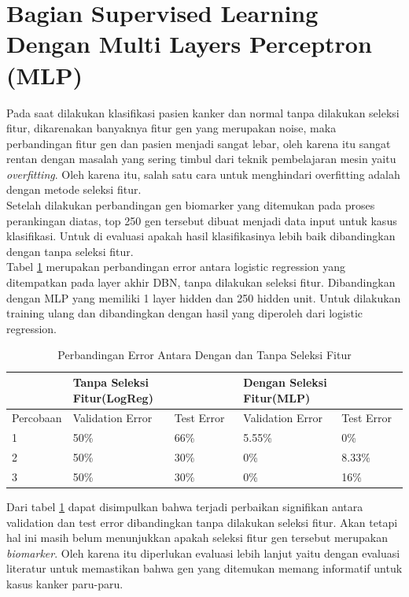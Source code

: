 \section{Bagian Supervised Learning Dengan Multi Layers Perceptron (MLP)}

Pada saat dilakukan klasifikasi pasien kanker dan normal tanpa dilakukan seleksi fitur, dikarenakan banyaknya fitur gen yang merupakan noise, maka perbandingan fitur gen dan pasien menjadi sangat lebar, oleh karena itu sangat rentan dengan masalah yang sering timbul dari teknik pembelajaran mesin yaitu \textit{overfitting}. Oleh karena itu, salah satu cara untuk menghindari overfitting adalah dengan metode seleksi fitur. \\
Setelah dilakukan perbandingan gen biomarker yang ditemukan pada proses perankingan diatas, top 250 gen tersebut dibuat menjadi data input untuk kasus klasifikasi. Untuk di evaluasi apakah hasil klasifikasinya lebih baik dibandingkan dengan tanpa seleksi fitur.\\
Tabel \ref{tab:tabel4.2} merupakan perbandingan error antara logistic regression yang ditempatkan pada layer akhir DBN, tanpa dilakukan seleksi fitur. Dibandingkan dengan MLP yang memiliki 1 layer hidden dan 250 hidden unit. Untuk dilakukan training ulang dan dibandingkan dengan hasil yang diperoleh dari logistic regression.

\begin{table}
\centering
\caption{Perbandingan Error Antara Dengan dan Tanpa Seleksi Fitur}
\label{tab:tabel4.2}
\begin{tabular}{@{}lllll@{}}
\toprule
 & \multicolumn{2}{l}{Tanpa Seleksi Fitur(LogReg)} & \multicolumn{2}{l}{Dengan Seleksi Fitur(MLP)} \\ \midrule
Percobaan & Validation Error & Test Error & Validation Error & Test Error \\
1 & 50\% & 66\% & 5.55\% & 0\% \\
2 & 50\% & 30\% & 0\% & 8.33\% \\
3 & 50\% & 30\% & 0\% & 16\% \\ \bottomrule
\end{tabular}
\end{table}

Dari tabel \ref{tab:tabel4.2} dapat disimpulkan bahwa terjadi perbaikan signifikan antara validation dan test error dibandingkan tanpa dilakukan seleksi fitur. Akan tetapi hal ini masih belum menunjukkan apakah seleksi fitur gen tersebut merupakan \textit{biomarker}. Oleh karena itu diperlukan evaluasi lebih lanjut yaitu dengan evaluasi literatur untuk memastikan bahwa gen yang ditemukan memang informatif untuk kasus kanker paru-paru.

